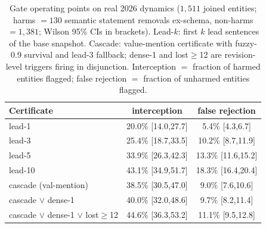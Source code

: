 \begin{table}[t]
\footnotesize
\caption{Gate operating points on real 2026 dynamics ($1{,}511$ joined
entities; harms $=130$ semantic statement removals ex-schema, non-harms
$=1{,}381$; Wilson 95\% CIs in brackets).  Lead-$k$: first $k$ lead
sentences of the base snapshot.  Cascade: value-mention certificate with
fuzzy-0.9 survival and lead-3 fallback; dense-1 and lost$\ge$12 are
revision-level triggers firing in disjunction.  Interception $=$
fraction of harmed entities flagged; false rejection $=$ fraction of
unharmed entities flagged.}
\label{tab:roc-real}
\tabcolsep 3pt
\begin{tabular*}{\columnwidth}{@{\extracolsep{\fill}}lcc@{}}
\toprule
Certificate & interception & false rejection \\\hline
lead-1  & 20.0\% [14.0,27.7]  & 5.4\% [4.3,6.7] \\
lead-3  & 25.4\% [18.7,33.5]  & 10.2\% [8.7,11.9] \\
lead-5  & 33.9\% [26.3,42.3]  & 13.3\% [11.6,15.2] \\
lead-10 & 43.1\% [34.9,51.7]  & 18.3\% [16.4,20.4] \\\hline
cascade (val-mention)                     & 38.5\% [30.5,47.0] & 9.0\% [7.6,10.6] \\
cascade $\vee$ dense-1                    & 40.0\% [32.0,48.6] & 9.7\% [8.2,11.4] \\
cascade $\vee$ dense-1 $\vee$ lost$\ge$12 & 44.6\% [36.3,53.2] & 11.1\% [9.5,12.8] \\
\bottomrule
\end{tabular*}
\end{table}